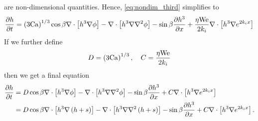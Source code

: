 are non-dimensional quantities. Hence, 
\cref{eq:nondim_third} simplifies to 
\begin{align}
    \frac{\partial h}{\partial t} = \left( 3\mathrm{Ca} \right)^{1/3} \cos\beta \nabla \cdot \left[  h^3 \nabla \phi  \right] - 
    \nabla \cdot \left[ h^3 \nabla\nabla^2\phi  \right] - 
    \sin\beta \frac{\partial h^3}{\partial x} + 
    \frac{\eta \mathrm{We}}{2k_i} \nabla \cdot \left[ h^3 \nabla e^{2k_i x} \right]
    \label{eq:nondim_fourth}
\end{align}  
If we further define 
\begin{equation*}
    D = \left( 3\mathrm{Ca} \right)^{1/3}, \quad C = \frac{\eta \mathrm{We}}{2k_i}
\end{equation*}
then we get a final equation 
\begin{align}
    \begin{aligned}
    \frac{\partial h}{\partial t} &= D \cos\beta \nabla \cdot \left[  h^3 \nabla \phi  \right] - 
    \nabla \cdot \left[ h^3 \nabla\nabla^2\phi  \right] - 
    \sin\beta \frac{\partial h^3}{\partial x} + 
    C \nabla \cdot \left[ h^3 \nabla e^{2k_i x} \right]\\
    &= D \cos\beta \nabla \cdot \left[  h^3 \nabla \left( h+s \right)  \right] - 
    \nabla \cdot \left[ h^3 \nabla\nabla^2\left( h+s \right)  \right] - 
    \sin\beta \frac{\partial h^3}{\partial x} + 
    C \nabla \cdot \left[ h^3 \nabla e^{2k_i x} \right].
    \end{aligned}
    \label{eq:nondim_final}
\end{align}  
